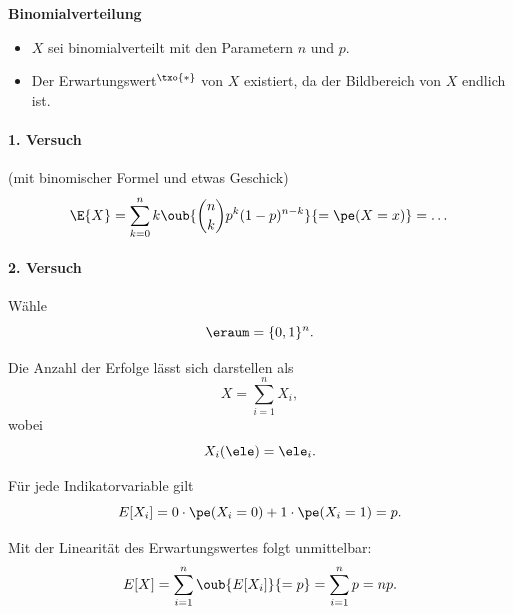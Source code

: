 \begin{bsp}
    \textbf{Binomialverteilung}    \\
    \begin{itemize}
        \item \(X\) sei binomialverteilt mit den Parametern \(n\) und \(p\).
        \item Der Erwartungswert$^{\txo{*}}$ von \(X\) existiert, da der Bildbereich von \(X\)
        endlich ist.
    \end{itemize}

    \paragraph{1. Versuch} (mit binomischer Formel und etwas Geschick)
    \[
        \E{X} = \sum^n_{k=0} k \oub{\binom{n}{k} p^k (1-p)^{n-k}}{=\pe(X=x)} = \dots
    \]

    \paragraph{2. Versuch}
    Wähle
    \[
        \eraum=\{0,1\}^n.
    \]

    Die Anzahl der Erfolge lässt sich darstellen als
    \[
        X=\sum_{i=1}^{n} X_i,
    \]
    wobei
    \[
        X_i(\ele)=\ele_i.
    \]

    Für jede Indikatorvariable gilt
    \[
        E[X_i]
        =
        0\cdot \pe(X_i=0)
        +
        1\cdot \pe(X_i=1)
        =
        p.
    \]

    Mit der Linearität des Erwartungswertes folgt unmittelbar:
    \[
        E[X]
        =
        \sum_{i=1}^{n} \oub{E[X_i]}{=p}
        =
        \sum_{i=1}^{n} p
        =
        np.
    \]
\end{bsp}

